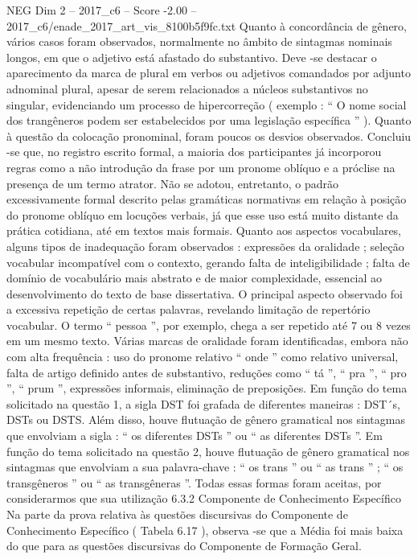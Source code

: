 \begin{textsample}{NEG Dim 2 – 2017\_c6 – Score -2.00 – 2017\_c6/enade\_2017\_art\_vis\_8100b5f9fc.txt}
Quanto à concordância de gênero, vários casos foram observados, normalmente no âmbito de sintagmas nominais longos, em que o adjetivo está afastado do substantivo.
Deve -se destacar o aparecimento da marca de plural em verbos ou adjetivos comandados por adjunto adnominal plural, apesar de serem relacionados a núcleos substantivos no singular, evidenciando um processo de hipercorreção ( exemplo : “ O nome social dos trangêneros podem ser estabelecidos por uma legislação específica ” ).
Quanto à questão da colocação pronominal, foram poucos os desvios observados.
Concluiu -se que, no registro escrito formal, a maioria dos participantes já incorporou regras como a não introdução da frase por um pronome oblíquo e a próclise na presença de um termo atrator.
Não se adotou, entretanto, o padrão excessivamente formal descrito pelas gramáticas normativas em relação à posição do pronome oblíquo em locuções verbais, já que esse uso está muito distante da prática cotidiana, até em textos mais formais.
Quanto aos aspectos vocabulares, alguns tipos de inadequação foram observados : expressões da oralidade ; seleção vocabular incompatível com o contexto, gerando falta de inteligibilidade ; falta de domínio de vocabulário mais abstrato e de maior complexidade, essencial ao desenvolvimento do texto de base dissertativa.
O principal aspecto observado foi a excessiva repetição de certas palavras, revelando limitação de repertório vocabular.
O termo “ pessoa ”, por exemplo, chega a ser repetido até 7 ou 8 vezes em um mesmo texto.
Várias marcas de oralidade foram identificadas, embora não com alta frequência : uso do pronome relativo “ onde ” como relativo universal, falta de artigo definido antes de substantivo, reduções como “ tá ”, “ pra ”, “ pro ”, “ prum ”, expressões informais, eliminação de preposições.
Em função do tema solicitado na questão 1, a sigla DST foi grafada de diferentes maneiras : DST´s, DSTs ou DSTS.
Além disso, houve flutuação de gênero gramatical nos sintagmas que envolviam a sigla : “ os diferentes DSTs ” ou “ as diferentes DSTs ”.
Em função do tema solicitado na questão 2, houve flutuação de gênero gramatical nos sintagmas que envolviam a sua palavra-chave : “ os trans ” ou “ as trans ” ; “ os transgêneros ” ou “ as transgêneras ”.
Todas essas formas foram aceitas, por considerarmos que sua utilização 6.3.2 Componente de Conhecimento Específico Na parte da prova relativa às questões discursivas do Componente de Conhecimento Específico ( Tabela 6.17 ), observa -se que a Média foi mais baixa do que para as questões discursivas do Componente de Formação Geral.

\end{textsample}
